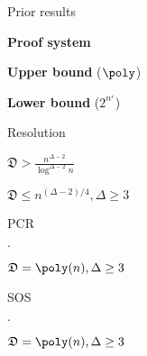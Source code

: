 \begin{frame}{Prior results}

    \begin{minipage}{0.2\linewidth}
        \textbf{Proof system}
    \end{minipage}
    \begin{minipage}{0.25\linewidth}
        \centering
        \textbf{Upper bound} ($\poly$)
    \end{minipage}
    \begin{minipage}{0.53\linewidth}
        \centering
        \textbf{Lower bound} ($2^{n^{\varepsilon}}$)
    \end{minipage}

    \vspace{0.3cm}
    \pause
    \begin{minipage}{0.2\linewidth}
        Resolution
    \end{minipage}
    \begin{minipage}{0.25\linewidth}
        \centering
        $\mathfrak{D} > \frac{n^{\Delta - 2}}{\log^{\Delta - 2} n}$
    \end{minipage}
    \begin{minipage}{0.53\linewidth}
        \centering
        $\mathfrak{D} \le n^{(\Delta - 2) / 4}, \Delta \ge 3$
    \end{minipage}

    \vspace{0.3cm}
    \pause
    \begin{minipage}{0.2\linewidth}
        PCR
    \end{minipage}
    \begin{minipage}{0.25\linewidth}
        \centering
        $\cdot$
    \end{minipage}
    \begin{minipage}{0.53\linewidth}
        \centering
        $\mathfrak{D} = \poly(n), \Delta \ge 3$
    \end{minipage}

    \vspace{0.3cm}
    \pause
    \begin{minipage}{0.2\linewidth}
        SOS
    \end{minipage}
    \begin{minipage}{0.25\linewidth}
        \centering
        $\cdot$
    \end{minipage}
    \begin{minipage}{0.53\linewidth}
        \centering
        $\mathfrak{D} = \poly(n), \Delta \ge 3$
    \end{minipage}


\end{frame}
